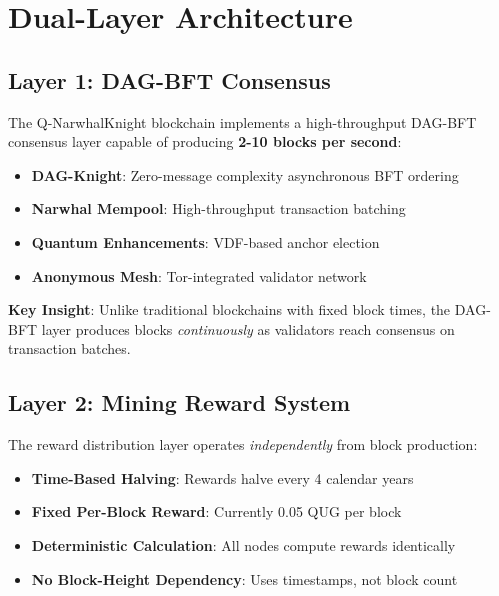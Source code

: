\documentclass[11pt,a4paper]{article}
\begin{document}
\section{Dual-Layer Architecture}

\subsection{Layer 1: DAG-BFT Consensus}

The Q-NarwhalKnight blockchain implements a high-throughput DAG-BFT consensus layer capable of producing \textbf{2-10 blocks per second}:

\begin{itemize}
    \item \textbf{DAG-Knight}: Zero-message complexity asynchronous BFT ordering
    \item \textbf{Narwhal Mempool}: High-throughput transaction batching
    \item \textbf{Quantum Enhancements}: VDF-based anchor election
    \item \textbf{Anonymous Mesh}: Tor-integrated validator network
\end{itemize}

\textbf{Key Insight}: Unlike traditional blockchains with fixed block times, the DAG-BFT layer produces blocks \textit{continuously} as validators reach consensus on transaction batches.

\subsection{Layer 2: Mining Reward System}

The reward distribution layer operates \textit{independently} from block production:

\begin{itemize}
    \item \textbf{Time-Based Halving}: Rewards halve every 4 calendar years
    \item \textbf{Fixed Per-Block Reward}: Currently 0.05 QUG per block
    \item \textbf{Deterministic Calculation}: All nodes compute rewards identically
    \item \textbf{No Block-Height Dependency}: Uses timestamps, not block count
\end{itemize}
\end{document}

